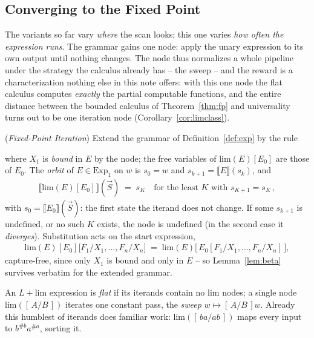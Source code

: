 \documentclass[runningheads,envcountsect]{llncs}
\begin{document}
\subsection{Converging to the Fixed Point}
\label{ssec:lim}

The variants so far vary \emph{where} the scan looks; this one varies
\emph{how often the expression runs}. The grammar gains one node:
apply the unary expression to its own output until nothing changes.
The node thus normalizes a whole pipeline under the strategy the
calculus already has -- the sweep -- and the reward is a
characterization nothing else in this note offers: with this one node
the flat calculus computes \emph{exactly} the partial computable
functions, and the entire distance between the bounded calculus of
Theorem~\ref{thm:fp} and universality turns out to be one iteration
node (Corollary~\ref{cor:limclass}).

\begin{definition}
    (\emph{Fixed-Point Iteration})
    \label{def:lim}
    Extend the grammar of Definition~\ref{def:exp} by the rule
    \begin{mathpar}
    \end{mathpar}
    where $X_1$ is \emph{bound} in $E$ by the node; the free variables of
    $\mathrm{lim}(E)[E_0]$ are those of $E_0$. The \emph{orbit} of
    $E \in \mathrm{Exp}_1$ on $w$ is $s_0 = w$ and
    $s_{k+1} = \llbracket E \rrbracket(s_k)$, and
    \begin{align}
        \llbracket \mathrm{lim}(E)[E_0] \rrbracket(\vec S) \;=\; s_K
        \quad \text{for the least $K$ with } s_{K+1} = s_K\,,
    \end{align}
    with $s_0 = \llbracket E_0 \rrbracket(\vec S)$: the first state the
    iterand does not change. If some $s_{k+1}$ is undefined, or no such
    $K$ exists, the node is undefined (in the second case it
    \emph{diverges}). Substitution acts on the start expression,
    \begin{align}
        \mathrm{lim}(E)[E_0]\big[F_1/X_1, \dots, F_n/X_n\big]
        \;=\; \mathrm{lim}(E)\big[\,E_0[F_1/X_1, \dots, F_n/X_n]\,\big],
    \end{align}
    capture-free, since only $X_1$ is bound and only in $E$ -- so
    Lemma~\ref{lem:beta} survives verbatim for the extended grammar.
\end{definition}

An $L{+}\mathrm{lim}$ expression is \emph{flat} if its iterands contain no
$\mathrm{lim}$ nodes; a single node $\mathrm{lim}([\,A/B\,])$ iterates one
constant pass, the \emph{sweep} $w \mapsto [\,A/B\,]w$. Already this
humblest of iterands does familiar work: $\mathrm{lim}([\,ba/ab\,])$
maps every input to $b^{\#b}a^{\#a}$, sorting it.
\end{document}
